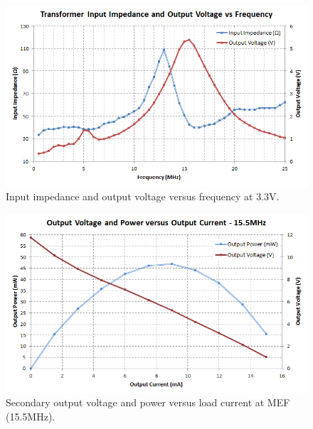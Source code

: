 \documentclass[conference]{IEEEtran}
\begin{document}
	\begin{figure}[t]
		\centering
		\includegraphics[width=1\columnwidth]{./img/ZandVoutVsF_3V3}
		\caption{Input impedance and output voltage versus frequency at 3.3V.}
		\label{fig:ZandVvsF}
	\end{figure}
	
	\begin{figure}[t]
		\centering
		\includegraphics[width=1\columnwidth]{./img/VandPvsI}
		\caption{Secondary output voltage and power versus load current at MEF (15.5MHz).}
		\label{fig:VandPvsI}
	\end{figure}
	
\end{document}
